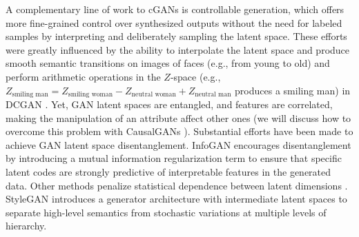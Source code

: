 A complementary line of work to cGANs is controllable generation, which offers more fine-grained control over synthesized outputs without the need for labeled samples by interpreting and deliberately sampling the latent space. These efforts were greatly influenced by the ability to interpolate the latent space and produce smooth semantic transitions on images of faces (e.g., from young to old) and perform arithmetic operations in the $Z$-space (e.g., $Z_{\text{smiling man}} = Z_{\text{smiling woman}} - Z_{\text{neutral woman}} + Z_{\text{neutral man}}$ produces a smiling man) in DCGAN \cite{radford2015unsupervised}. Yet, GAN latent spaces are entangled, and features are correlated, making the manipulation of an attribute affect other ones (we will discuss how to overcome this problem with CausalGANs \cite{kocaoglu2017causalgan}). Substantial efforts have been made to achieve GAN latent space disentanglement. InfoGAN encourages disentanglement by introducing a mutual information regularization term to ensure that specific latent codes are strongly predictive of interpretable features in the generated data. Other methods penalize statistical dependence between latent dimensions \cite{yu2021michigan}. StyleGAN \cite{karras2019style} introduces a generator architecture with intermediate latent spaces to separate high-level semantics from stochastic variations at multiple levels of hierarchy.


